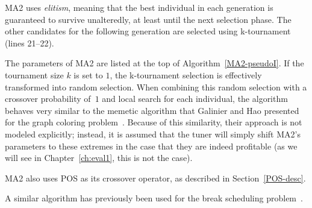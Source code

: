 \documentclass[thesis.tex]{subfiles}
\begin{document}
\gls{MA2} uses \emph{elitism}, meaning that the best individual in each generation is guaranteed to survive unalteredly, at least until the next selection phase. The other candidates for the following generation are selected using k-tournament (lines 21--22).


The parameters of \gls{MA2} are listed at the top of Algorithm~\ref{MA2-pseudoI}. If the tournament size $k$ is set to $1$, the k-tournament selection is effectively transformed into random selection. When combining this random selection with a crossover probability of~$1$ and local search for each individual, the algorithm behaves very similar to the memetic algorithm that Galinier and Hao presented for the graph coloring problem~\parencite{galinier98hybrid}. Because of this similarity, their approach is not modeled explicitly; instead, it is assumed that the tuner will simply shift \gls{MA2}'s parameters to these extremes in the case that they are indeed profitable (as we will see in Chapter~\ref{ch:eval1}, this is not the case).


\gls{MA2} also uses \gls{POS} as its crossover operator, as described in Section~\vref{POS-desc}.

A similar algorithm has previously been used for the break scheduling problem~\parencite{widl-thesis,widl-paper}.
\end{document}
